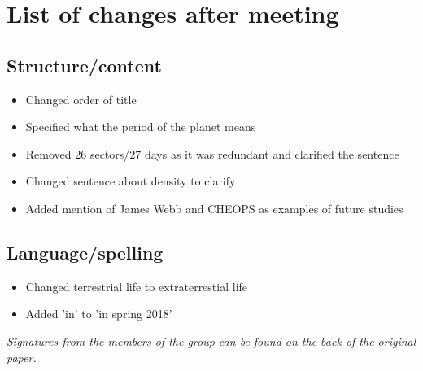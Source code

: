 \documentclass[titlepage]{article}
\begin{document}
	\section*{List of changes after meeting}
	\subsection*{Structure/content}
	\begin{itemize}
		\item Changed order of title
		\item Specified what the period of the planet means
		\item Removed 26 sectors/27 days as it was redundant and clarified the sentence
		\item Changed sentence about density to clarify
		\item Added mention of James Webb and CHEOPS as examples of future studies
		
	\end{itemize}
	\subsection*{Language/spelling}
	\begin{itemize}
		\item Changed terrestrial life to extraterrestial life
		\item Added 'in' to 'in spring 2018'
	\end{itemize}
	
	\textit{Signatures from the members of the group can be found on the back of the original paper.}
\end{document}
